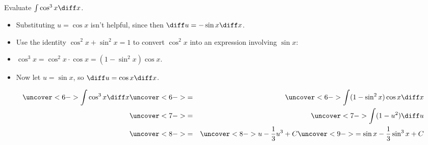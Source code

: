 \begin{frame}
\begin{example} %
Evaluate $\int \cos^3 x \diff x$.
\begin{itemize}
\item<2->  Substituting $u =\cos x$ isn't helpful, since then $\diff u = -\sin x \diff x$.
\item<3->  Use the identity $\cos^2 x + \sin^2 x = 1$ to convert $\cos^2 x$ into an expression involving $\sin x$:
\item<4-| alert@6>  $\cos^3 x = \cos^2 x \cdot \cos x = (1 - \sin^2 x)\cos x$.
\item<5-| alert@7>  Now let $u = \sin x$, so $\diff u = \cos x \diff x$.
\end{itemize}
\abovedisplayskip=0pt
\belowdisplayskip=0pt
\begin{eqnarray*}
\uncover<6->{%
\int \cos^3 x \diff x 
}%
& \uncover<6->{ = } &%
\uncover<6->{%
\int (1-\sin^2 x)\cos x\diff x
}\\%
& \uncover<7->{ = } &%
\uncover<7->{%
\int (1-u^2)\diff u
}\\%
& \uncover<8->{ = } &%
\uncover<8->{%
u - \frac{1}{3}u^3 + C
}%
\uncover<9->{%
 = \sin x - \frac{1}{3}\sin^3 x + C
}%
\end{eqnarray*}
\end{example}
\end{frame}

